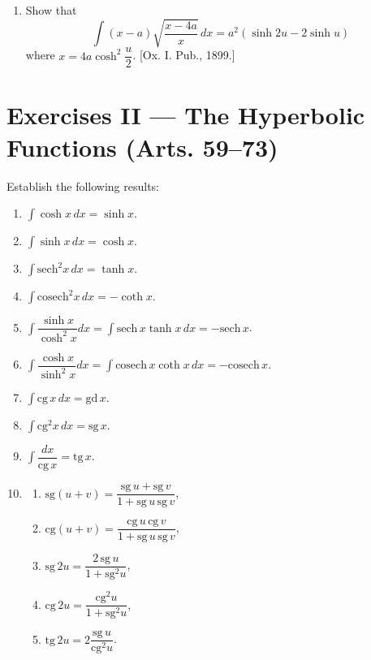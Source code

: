 \documentclass[11pt, a4paper]{article}
\newcommand{\source}[1]{\hfill\textnormal{[#1]}}
\begin{document}
\begin{enumerate}[leftmargin=2em]
\item Show that
\[
\int (x-a)\sqrt{\dfrac{x-4a}{x}}\,dx = a^2(\sinh 2u - 2\sinh u)
\]
where $x=4a\cosh^2\dfrac{u}{2}$. \source{Ox. I. Pub., 1899.}

\end{enumerate}

\section*{Exercises II --- The Hyperbolic Functions (Arts. 59--73)}

Establish the following results:

\begin{enumerate}[leftmargin=2em]

\item $\displaystyle\int \cosh x\,dx=\sinh x$.

\item $\displaystyle\int \sinh x\,dx=\cosh x$.

\item $\displaystyle\int \text{sech}^2x\,dx=\tanh x$.

\item $\displaystyle\int \text{cosech}^2x\,dx=-\coth x$.

\item $\displaystyle\int \dfrac{\sinh x}{\cosh^2 x}dx=\int \text{sech}\,x\tanh x\,dx=-\text{sech}\,x$.

\item $\displaystyle\int \dfrac{\cosh x}{\sinh^2 x}dx=\int \text{cosech}\,x\coth x\,dx=-\text{cosech}\,x$.

\item $\displaystyle\int \text{cg}\,x\,dx=\text{gd}\,x$.

\item $\displaystyle\int \text{cg}^2x\,dx=\text{sg}\,x$.

\item $\displaystyle\int \dfrac{dx}{\text{cg}\,x}=\text{tg}\,x$.

\item
\begin{enumerate}[label=(\alph*)]
\item $\text{sg}(u+v)=\dfrac{\text{sg}\,u+\text{sg}\,v}{1+\text{sg}\,u\,\text{sg}\,v}$,
\item $\text{cg}(u+v)=\dfrac{\text{cg}\,u\,\text{cg}\,v}{1+\text{sg}\,u\,\text{sg}\,v}$,
\item $\text{sg}\,2u=\dfrac{2\,\text{sg}\,u}{1+\text{sg}^2u}$,
\item $\text{cg}\,2u=\dfrac{\text{cg}^2u}{1+\text{sg}^2u}$,
\item $\text{tg}\,2u=2\dfrac{\text{sg}\,u}{\text{cg}^2u}$.
\end{enumerate}

\end{enumerate}
\end{document}
